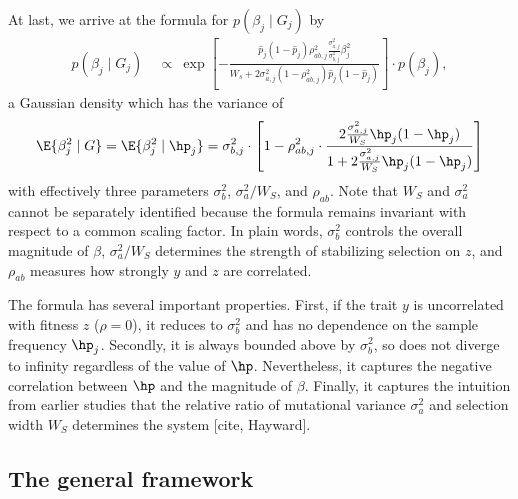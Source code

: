 At last, we arrive at the formula for $p(\beta_j \mid G_j)$ by
\begin{align}
    p(\beta_j \mid G_j) &\ \propto \ 
    \exp \left[ -\frac{\hat{p}_j(1 - \hat{p}_j) \rho_{ab,j}^2 \frac{\sigma_{a,j}^2}{\sigma_{b,j}^2} \beta_j^2}{W_s + 2\sigma_{a,j}^2(1 - \rho_{ab,j}^2)\hat{p}_j(1 - \hat{p}_j)} \right] \cdot p(\beta_j), 
\end{align}
a Gaussian density which has the variance of
\begin{align} \label{eq:beta_cond_var}
    \E{\beta_j^2 \mid G} = \E{\beta_j^2 \mid \hp_j} = 
    \sigma_{b,j}^2 \cdot 
    \left[
    1 - \rho_{ab,j}^2 \cdot
        \frac{
             2\frac{\sigma_{a,j}^2}{W_S} \hp_j(1-\hp_j)}{
            1 + 2\frac{\sigma_{a,j}^2}{W_S} \hp_j(1-\hp_j) 
        }
    \right]
\end{align}
with effectively three parameters $\sigma_b^2$, $\sigma_a^2 / W_S$, and $\rho_{ab}$.
Note that $W_S$ and $\sigma_a^2$ cannot be separately identified because the formula remains invariant with respect to a common scaling factor.
In plain words, $\sigma_b^2$ controls the overall magnitude of $\beta$, $\sigma_a^2/W_S$ determines the strength of stabilizing selection on $z$, and $\rho_{ab}$ measures how strongly $y$ and $z$ are correlated.

The formula has several important properties.
First, if the trait $y$ is uncorrelated with fitness $z$ ($\rho=0$), it reduces to $\sigma_b^2$ and has no dependence on the sample frequency $\hp_j$.
Secondly, it is always bounded above by $\sigma_b^2$, so does not diverge to infinity regardless of the value of $\hp$.
Nevertheless, it captures the negative correlation between $\hp$ and the magnitude of $\beta$.
Finally, it captures the intuition from earlier studies that the relative ratio of mutational variance $\sigma_{a}^2$ and selection width $W_S$ determines the system [cite, Hayward].




\subsection{The general framework}

